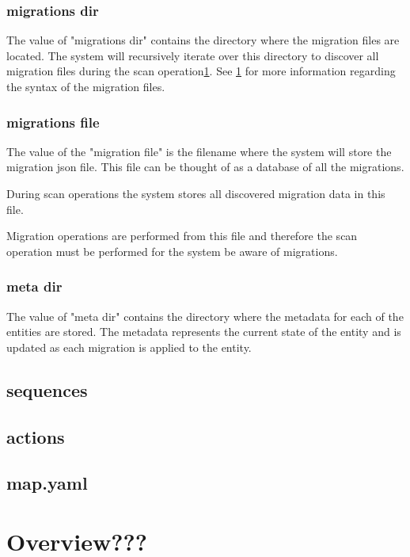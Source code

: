 \documentclass[]{article}
\begin{document}
\subsubsection{migrations dir}
The value of "migrations dir" contains the directory where the migration files are located. The system will recursively iterate over this directory to discover all migration files during the scan operation\ref{}. See \ref{} for more information regarding the syntax of the migration files. 

\subsubsection{migrations file}
The value of the "migration file" is the filename where the system will store the migration json file. This file can be thought of as a database of all the migrations.

During scan operations the system stores all discovered migration data in this file.

Migration operations are performed from this file and therefore the scan operation must be performed for the system be aware of migrations.

\subsubsection{meta dir}
The value of "meta dir" contains the directory where the metadata for each of the entities are stored. The metadata represents the current state of the entity and is updated as each migration is applied to the entity.

\subsection{sequences}

\subsection{actions}

\subsection{map.yaml}

 

\section{Overview???}
\end{document}
